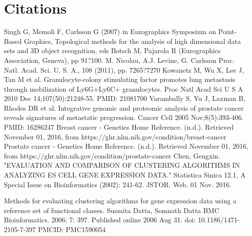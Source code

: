 \documentclass[preprint,10pt]{elsarticle}
\begin{document}
\section{Citations}

\begin{thebibliography}{2}
 Singh G, Memoli F, Carlsson G (2007) in Eurographics Symposium on Point-Based Graphics, Topological methods for the analysis of high dimensional data sets and 3D object recognition, eds Botsch M, Pajarola R (Eurographics Association, Geneva), pp 91?100.
M. Nicolau, A.J. Levine, G. Carlsson
Proc. Natl. Acad. Sci. U. S. A., 108 (2011), pp. 7265?7270
Kowanetz M, Wu X, Lee J, Tan M et al. Granulocyte-colony stimulating factor promotes lung metastasis through mobilization of Ly6G+Ly6C+ granulocytes. Proc Natl Acad Sci U S A 2010 Dec 14;107(50):21248-55. PMID: 21081700
Varambally S, Yu J, Laxman B, Rhodes DR et al. Integrative genomic and proteomic analysis of prostate cancer reveals signatures of metastatic progression. Cancer Cell 2005 Nov;8(5):393-406. PMID: 16286247
 Breast cancer - Genetics Home Reference. (n.d.). Retrieved November 01, 2016, from https://ghr.nlm.nih.gov/condition/breast-cancer
 Prostate cancer - Genetics Home Reference. (n.d.). Retrieved November 01, 2016, from https://ghr.nlm.nih.gov/condition/prostate-cancer
 Chen, Gengxin. "EVALUATION AND COMPARISON OF CLUSTERING ALGORITHMS IN ANALYZING ES CELL GENE EXPRESSION DATA." Statistica Sinica 12.1, A Special Issue on Bioinformatics (2002): 241-62. JSTOR. Web. 01 Nov. 2016.

 Methods for evaluating clustering algorithms for gene expression data using a reference set of functional classes. 
Susmita Datta, Somnath Datta
BMC Bioinformatics. 2006; 7: 397. Published online 2006 Aug 31. doi: 10.1186/1471-2105-7-397
PMCID: PMC1590054

\end{thebibliography}




\end{document}
